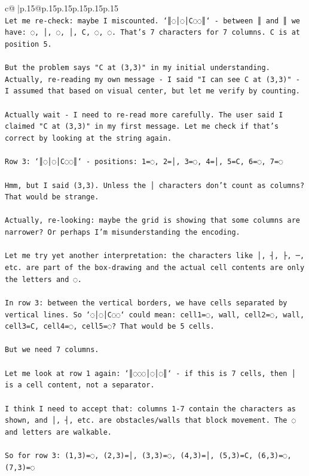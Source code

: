 \documentclass{article}
\begin{document}
{\begin{supertabular}{c@{$\;$}|p{.15\linewidth}@{}p{.15\linewidth}p{.15\linewidth}p{.15\linewidth}p{.15\linewidth}p{.15\linewidth}}
{{{\\ 
\texttt{Let me re{-}check: maybe I miscounted. `║◌│◌│C◌◌║` {-} between ║ and ║ we have: ◌, │, ◌, │, C, ◌, ◌. That's 7 characters for 7 columns. C is at position 5.} \\
\\ 
\texttt{But the problem says "C at (3,3)" in my initial understanding. Actually, re{-}reading my own message {-} I said "I can see C at (3,3)" {-} I assumed that based on visual center, but let me verify by counting.} \\
\\ 
\texttt{Actually wait {-} I need to re{-}read more carefully. The user said I claimed "C at (3,3)" in my first message. Let me check if that's correct by looking at the string again.} \\
\\ 
\texttt{Row 3: `║◌│◌│C◌◌║` {-} positions: 1=◌, 2=│, 3=◌, 4=│, 5=C, 6=◌, 7=◌} \\
\\ 
\texttt{Hmm, but I said (3,3). Unless the │ characters don't count as columns? That would be strange.} \\
\\ 
\texttt{Actually, re{-}looking: maybe the grid is showing that some columns are narrower? Or perhaps I'm misunderstanding the encoding.} \\
\\ 
\texttt{Let me try yet another interpretation: the characters like │, ┤, ├, ─, etc. are part of the box{-}drawing and the actual cell contents are only the letters and ◌.} \\
\\ 
\texttt{In row 3: between the vertical borders, we have cells separated by vertical lines. So `◌│◌│C◌◌` could mean: cell1=◌, wall, cell2=◌, wall, cell3=C, cell4=◌, cell5=◌? That would be 5 cells.} \\
\\ 
\texttt{But we need 7 columns. } \\
\\ 
\texttt{Let me look at row 1 again: `║◌◌◌│◌│◌║` {-} if this is 7 cells, then │ is a cell content, not a separator.} \\
\\ 
\texttt{I think I need to accept that: columns 1{-}7 contain the characters as shown, and │, ┤, etc. are obstacles/walls that block movement. The ◌ and letters are walkable.} \\
\\ 
\texttt{So for row 3: (1,3)=◌, (2,3)=│, (3,3)=◌, (4,3)=│, (5,3)=C, (6,3)=◌, (7,3)=◌} \\
}}}
\end{supertabular}}
\end{document}
